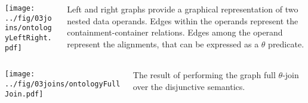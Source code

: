 \begin{multilucido}
	\begin{sottolucido}
		\begin{columns}[c, onlytextwidth]
			\begin{column}{.6\textwidth}
				\begin{center}
				\texttt{[image: ../fig/03joins/ontologyLeftRight.pdf]}
				\end{center}
			\end{column}
		\begin{column}{.4\textwidth}
			Left and right graphs provide a graphical representation of two nested data operands. Edges within the operands represent the containment-container relations. Edges among the operand represent the alignments, that can be expressed as a $\theta$ predicate. 
		\end{column}
	\end{columns}
	\end{sottolucido}

	\begin{sottolucido}
		\begin{columns}[c, onlytextwidth]
			\begin{column}{.6\textwidth}
				\begin{center}
				\texttt{[image: ../fig/03joins/ontologyFullJoin.pdf]}
			\end{center}
			\end{column}
			\begin{column}{.4\textwidth}
				The result of performing the graph full $\theta$-join over the disjunctive semantics.
			\end{column}
		\end{columns}
	\end{sottolucido}
\end{multilucido}